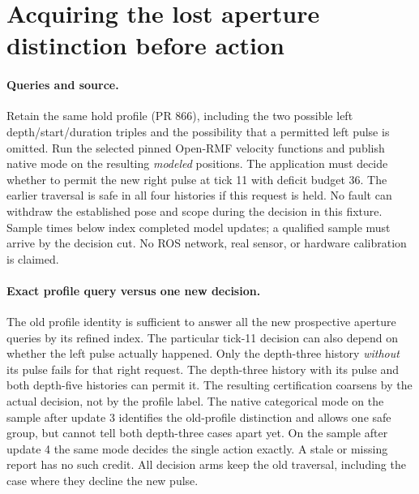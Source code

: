 \documentclass{article}
\begin{document}
\section*{Acquiring the lost aperture distinction before action}
\paragraph{Queries and source.}
Retain the same hold profile (PR 866), including the two possible
left depth/start/duration triples and the possibility that a
permitted left pulse is omitted. Run the selected pinned Open-RMF
velocity functions and publish native mode on the resulting
\emph{modeled} positions. The application must decide whether to
permit the new right pulse at tick 11 with deficit budget 36. The
earlier traversal is safe in all four histories if this request is
held. No fault can withdraw the established pose and scope during
the decision in this fixture. Sample times below index completed
model updates; a qualified sample must arrive by the decision
cut. No ROS network, real sensor, or hardware calibration is
claimed.

\paragraph{Exact profile query versus one new decision.}
The old profile identity is sufficient to answer all the new
prospective aperture queries by its refined index. The particular
tick-11 decision can also depend on whether the left pulse
actually happened. Only the depth-three history \emph{without}
its pulse fails for that right request. The depth-three history
with its pulse and both depth-five histories can permit it.
The resulting certification coarsens by the actual decision,
not by the profile label. The native categorical mode on the
sample after update 3 identifies the old-profile distinction and
allows one safe group, but cannot tell both depth-three cases
apart yet. On the sample after update 4 the same mode decides
the single action exactly. A stale or missing report has no such
credit. All decision arms keep the old traversal, including the
case where they decline the new pulse.
\end{document}
